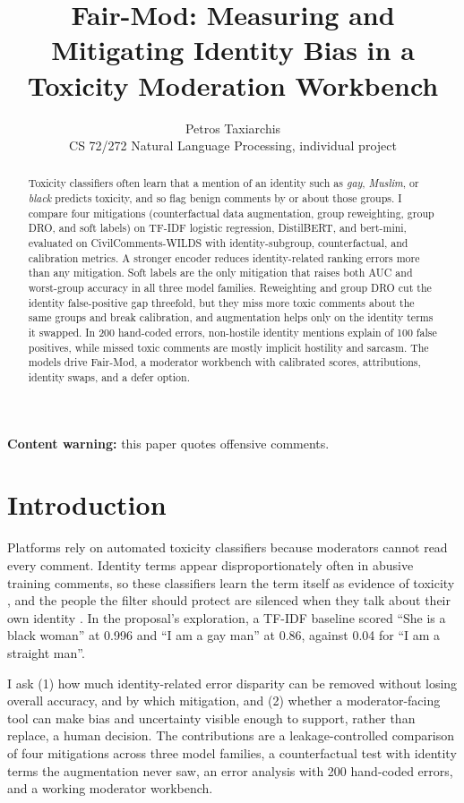 \documentclass[11pt]{article}
\title{Fair-Mod: Measuring and Mitigating Identity Bias in a\\Toxicity Moderation Workbench}
\author{Petros Taxiarchis \\ CS 72/272 Natural Language Processing, individual project}
\begin{document}
\maketitle

\begin{abstract}
Toxicity classifiers often learn that a mention of an identity such as \emph{gay}, \emph{Muslim}, or \emph{black}
predicts toxicity, and so flag benign comments by or about those groups. I compare four mitigations (counterfactual
data augmentation, group reweighting, group DRO, and soft labels) on TF-IDF logistic regression, DistilBERT, and
bert-mini, evaluated on CivilComments-WILDS with identity-subgroup, counterfactual, and calibration metrics. A stronger encoder reduces identity-related
ranking errors more than any mitigation. Soft labels are the only mitigation that raises both AUC and worst-group
accuracy in all three model families. Reweighting and group DRO cut the identity false-positive gap threefold, but
they miss more toxic comments about the same groups and break calibration, and augmentation helps only on the identity
terms it swapped. In 200 hand-coded errors, non-hostile identity mentions explain \HandFPIdentity{} of 100 false
positives, while missed toxic comments are mostly implicit hostility and sarcasm. The models drive Fair-Mod, a
moderator workbench with calibrated scores, attributions, identity swaps, and a defer option.
\end{abstract}

\noindent\textbf{Content warning:} this paper quotes offensive comments.

\section{Introduction}
Platforms rely on automated toxicity classifiers because moderators cannot read every comment. Identity terms appear
disproportionately often in abusive training comments, so these classifiers learn the term itself as evidence of
toxicity \citep{dixon2018measuring,borkan2019nuanced}, and the people the filter should protect are silenced when they
talk about their own identity \citep{sap2019risk}. In the proposal's exploration, a TF-IDF baseline scored ``She is a
black woman'' at 0.996 and ``I am a gay man'' at 0.86, against 0.04 for ``I am a straight man''.

I ask (1) how much identity-related error disparity can be removed without losing overall accuracy, and by which
mitigation, and (2) whether a moderator-facing tool can make bias and uncertainty visible enough to support, rather
than replace, a human decision. The contributions are a leakage-controlled comparison of four mitigations across three
model families, a counterfactual test with identity terms the augmentation never saw, an error analysis with 200
hand-coded errors, and a working moderator workbench.
\end{document}
